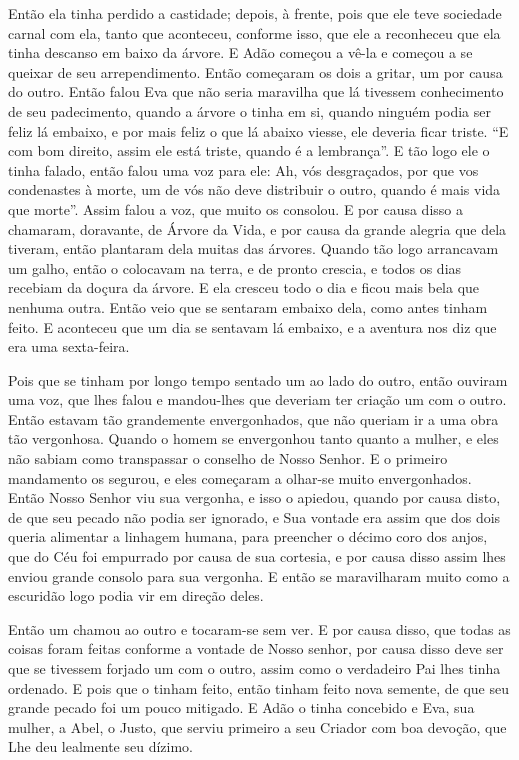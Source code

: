 Então ela tinha perdido a castidade; depois, à frente, pois que ele teve
sociedade carnal com ela, tanto que aconteceu, conforme isso, que ele a
reconheceu que ela tinha descanso em baixo da árvore. E Adão começou a vê-la e
começou a se queixar de seu arrependimento. Então começaram os dois a gritar,
um por causa do outro. Então falou Eva que não seria maravilha que lá tivessem
conhecimento de seu padecimento, quando a árvore o tinha em si, quando ninguém
podia ser feliz lá embaixo, e por mais feliz o que lá abaixo viesse, ele
deveria ficar triste. “E com bom direito, assim ele está triste, quando é a
lembrança”. E tão logo ele o tinha falado, então falou uma voz para ele: Ah,
vós desgraçados, por que vos condenastes à morte, um de vós não deve distribuir
o outro, quando é mais vida que morte”. Assim falou a voz, que muito os
consolou. E por causa disso a chamaram, doravante, de Árvore da Vida, e por
causa da grande alegria que dela tiveram, então plantaram dela muitas das
árvores. Quando tão logo arrancavam um galho, então o colocavam na terra, e de
pronto crescia, e todos os dias recebiam da doçura da árvore. E ela cresceu
todo o dia e ficou mais bela que nenhuma outra. Então veio que se sentaram
embaixo dela, como antes tinham feito. E aconteceu que um dia se sentavam lá
embaixo, e a aventura nos diz que era uma sexta-feira.

Pois que se tinham por longo tempo sentado um ao lado do outro, então ouviram
uma voz, que lhes falou e mandou-lhes que deveriam ter criação um com o outro.
Então estavam tão grandemente envergonhados, que não queriam ir a uma obra tão
vergonhosa. Quando o homem se envergonhou tanto quanto a mulher, e eles não
sabiam como transpassar o conselho de Nosso Senhor. E o primeiro mandamento os
segurou, e eles começaram a olhar-se muito envergonhados. Então Nosso Senhor
viu sua vergonha, e isso o apiedou, quando por causa disto, de que seu pecado
não podia ser ignorado, e Sua vontade era assim que dos dois queria alimentar a
linhagem humana, para preencher o décimo coro dos anjos, que do Céu foi
empurrado por causa de sua cortesia, e por causa disso assim lhes enviou grande
consolo para sua vergonha. E então se maravilharam muito como a escuridão logo
podia vir em direção deles. 

Então um chamou ao outro e tocaram-se sem ver. E por causa disso, que todas as
coisas foram feitas conforme a vontade de Nosso senhor, por causa disso deve
ser que se tivessem forjado um com o outro, assim como o verdadeiro Pai lhes
tinha ordenado. E pois que o tinham feito, então tinham feito nova semente, de
que seu grande pecado foi um pouco mitigado. E Adão o tinha concebido e Eva,
sua mulher, a Abel, o Justo, que serviu primeiro a seu Criador com boa devoção,
que Lhe deu lealmente seu dízimo.

